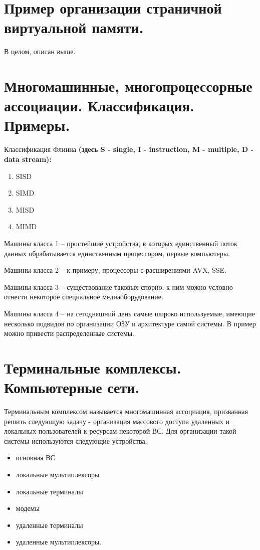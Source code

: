 \documentclass[a4paper,12pt,titlepage,finall]{article}
\begin{document}
\section{Пример организации страничной виртуальной памяти.}
В целом, описан выше.
\section{Многомашинные, многопроцессорные ассоциации. Классификация. Примеры.}
Классификация Флинна \textbf{(здесь S - single, I - instruction, M - multiple, D - data stream):}

\begin{enumerate}
    \item SISD
    \item SIMD
    \item MISD
    \item MIMD
\end{enumerate}
Машины класса 1 -- простейшие устройства, в которых единственный поток данных обрабатывается единственным процессором, первые компьютеры.

Машины класса 2 -- к примеру, процессоры с расширениями AVX, SSE.

Машины класса 3 -- существование таковых спорно, к ним можно условно отнести некоторое специальное медиаоборудование.

Машины класса 4 -- на сегодняшний день самые широко используемые, имеющие несколько подвидов по организации ОЗУ и архитектуре самой системы. В пример можно привести распределенные системы.
\section{Терминальные комплексы. Компьютерные сети.}
Терминальным комплексом называется многомашинная ассоциация, призванная решить следующую задачу - организация массового доступа удаленных и локальных пользователей к ресурсам некоторой ВС. Для организации такой системы используются следующие устройства:
\begin{itemize}
    \item основная ВС
    \item локальные мультиплексоры
    \item локальные терминалы
    \item модемы
    \item удаленные терминалы
    \item удаленные мультиплексоры.
\end{itemize}
\end{document}
